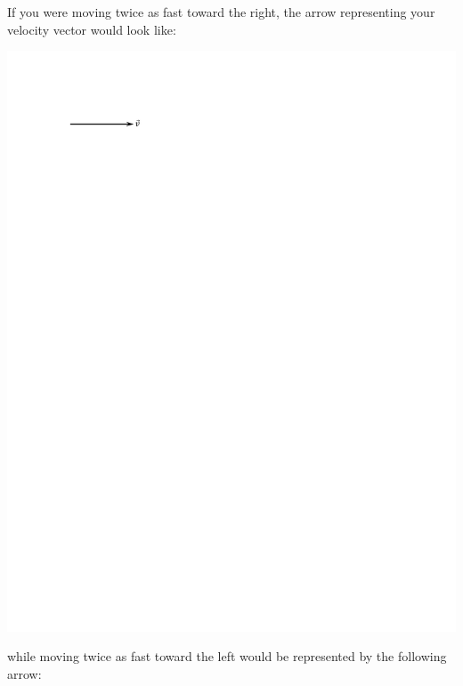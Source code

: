 If you were moving twice as fast toward the right, the arrow representing your
velocity vector would look like:

\vspace{0.3cm}
{\par\centering \includegraphics{velocity/velocity_vector_2x.pdf} \par}
\vspace{0.3cm}

while moving twice as fast toward the left would be represented by the following
arrow:

